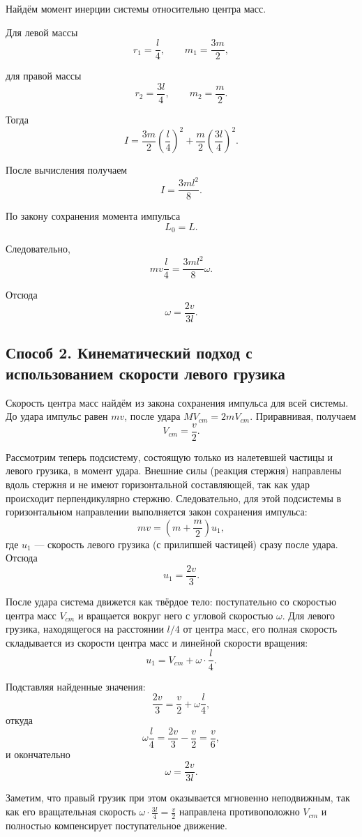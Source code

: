 \documentclass[a4paper,12pt]{article}
\begin{document}
Найдём момент инерции системы относительно центра масс.

Для левой массы
\[
r_1=\frac{l}{4}, \qquad m_1=\frac{3m}{2},
\]

для правой массы
\[
r_2=\frac{3l}{4}, \qquad m_2=\frac{m}{2}.
\]

Тогда
\[
I=
\frac{3m}{2}\left(\frac{l}{4}\right)^2
+
\frac{m}{2}\left(\frac{3l}{4}\right)^2.
\]

После вычисления получаем
\[
I=\frac{3ml^2}{8}.
\]

По закону сохранения момента импульса
\[
L_0=L.
\]

Следовательно,
\[
m v \frac{l}{4}
=
\frac{3ml^2}{8}\omega .
\]

Отсюда
\[
\boxed{\omega=\frac{2v}{3l}}.
\]

\subsection*{Способ 2. Кинематический подход с использованием скорости левого грузика}

Скорость центра масс найдём из закона сохранения импульса для всей системы. До удара импульс равен $mv$, после удара $M V_{cm}=2m V_{cm}$. Приравнивая, получаем
\[
V_{cm}=\frac{v}{2}.
\]

Рассмотрим теперь подсистему, состоящую только из налетевшей частицы и левого грузика, в момент удара. Внешние силы (реакция стержня) направлены вдоль стержня и не имеют горизонтальной составляющей, так как удар происходит перпендикулярно стержню. Следовательно, для этой подсистемы в горизонтальном направлении выполняется закон сохранения импульса:
\[
m v = \left(m + \frac{m}{2}\right) u_1,
\]
где $u_1$ — скорость левого грузика (с прилипшей частицей) сразу после удара. Отсюда
\[
u_1 = \frac{2v}{3}.
\]

После удара система движется как твёрдое тело: поступательно со скоростью центра масс $V_{cm}$ и вращается вокруг него с угловой скоростью $\omega$. Для левого грузика, находящегося на расстоянии $l/4$ от центра масс, его полная скорость складывается из скорости центра масс и линейной скорости вращения:
\[
u_1 = V_{cm} + \omega \cdot \frac{l}{4}.
\]

Подставляя найденные значения:
\[
\frac{2v}{3} = \frac{v}{2} + \omega \frac{l}{4},
\]
откуда
\[
\omega \frac{l}{4} = \frac{2v}{3} - \frac{v}{2} = \frac{v}{6},
\]
и окончательно
\[
\boxed{\omega = \frac{2v}{3l}}.
\]

Заметим, что правый грузик при этом оказывается мгновенно неподвижным, так как его вращательная скорость $\omega \cdot \frac{3l}{4} = \frac{v}{2}$ направлена противоположно $V_{cm}$ и полностью компенсирует поступательное движение.
\end{document}
